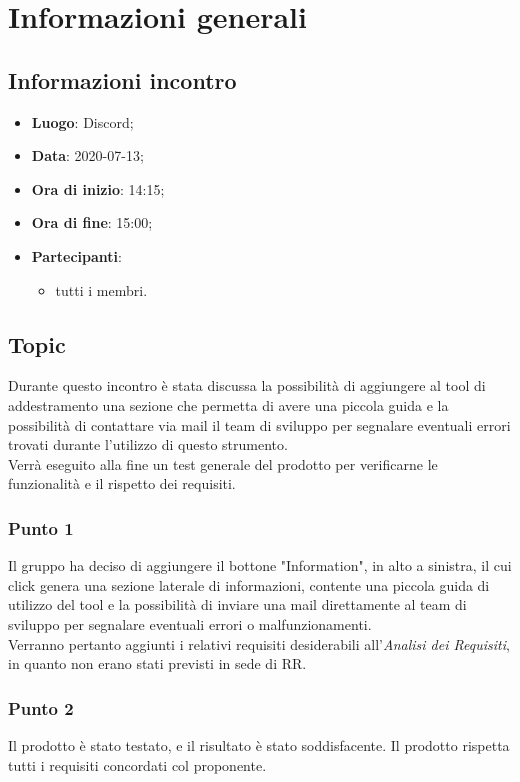 \section{Informazioni generali}
\subsection{Informazioni incontro}
\begin{itemize}
\item \textbf{Luogo}: Discord;
\item \textbf{Data}: 2020-07-13;
\item \textbf{Ora di inizio}: 14:15;
\item \textbf{Ora di fine}: 15:00;
\item \textbf{Partecipanti}:
	\begin{itemize}
		\item tutti i membri.
	\end{itemize}
\end{itemize}

\subsection{Topic}
Durante questo incontro è stata discussa la possibilità di aggiungere al tool di addestramento una sezione che permetta di avere una piccola guida e la possibilità di contattare via mail il team di sviluppo per segnalare eventuali errori trovati durante l'utilizzo di questo strumento. \\
Verrà eseguito alla fine un test generale del prodotto per verificarne le funzionalità e il rispetto dei requisiti.

\subsubsection{Punto 1}
Il gruppo ha deciso di aggiungere il bottone "Information", in alto a sinistra, il cui click genera una sezione laterale di informazioni, contente una piccola guida di utilizzo del tool e la possibilità di inviare una mail direttamente al team di sviluppo per segnalare eventuali errori o malfunzionamenti.\\
Verranno pertanto aggiunti i relativi requisiti desiderabili all'\textit{Analisi dei Requisiti}, in quanto non erano stati previsti in sede di RR.

\subsubsection{Punto 2}
Il prodotto è stato testato, e il risultato è stato soddisfacente. Il prodotto rispetta tutti i requisiti concordati col proponente.


